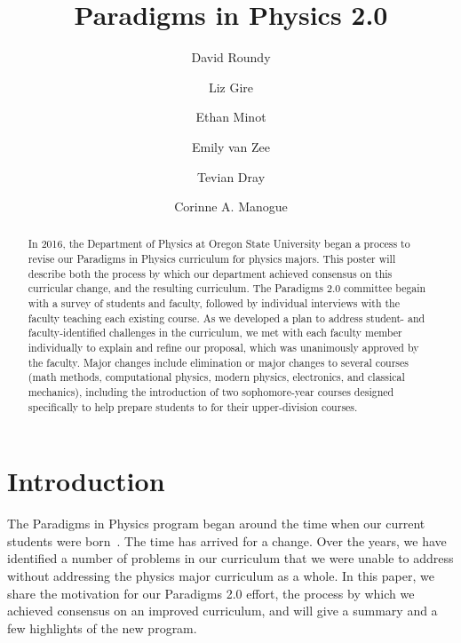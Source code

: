 \documentclass[english,aps,pra,reprint,noshowpacs,superscriptaddress]{revtex4-1}
\begin{document}
\title{Paradigms in Physics 2.0}
\author{David Roundy}
\author{Liz Gire}
\author{Ethan Minot}
\author{Emily van Zee}
\author{Tevian Dray}
\author{Corinne A. Manogue}


\begin{abstract}
In 2016, the Department of Physics at Oregon State University began a
process to revise our Paradigms in Physics curriculum for physics
majors.  This poster will describe both the process by which our
department achieved consensus on this curricular change, and the
resulting curriculum.  The Paradigms 2.0 committee begain with a
survey of students and faculty, followed by individual interviews with
the faculty teaching each existing course.  As we developed a plan to
address student- and faculty-identified challenges in the curriculum,
we met with each faculty member individually to explain and refine our
proposal, which was unanimously approved by the faculty.  Major
changes include elimination or major changes to several courses (math
methods, computational physics, modern physics, electronics, and
classical mechanics), including the introduction of two sophomore-year
courses designed specifically to help prepare students to for their
upper-division courses.
\end{abstract}

\maketitle

\section{Introduction}
The Paradigms in Physics program began around the time when our
current students were born~\cite{manogue2001paradigms}.  The time has
arrived for a change.  Over the years, we have identified a number of
problems in our curriculum that we were unable to address without
addressing the physics major curriculum as a whole.  In this paper, we
share the motivation for our Paradigms 2.0 effort, the process by
which we achieved consensus on an improved curriculum, and will give
a summary and a few highlights of the new program.
\end{document}
